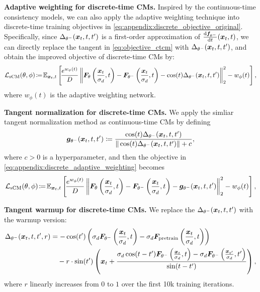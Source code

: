 \textbf{Adaptive weighting for discrete-time CMs. }
Inspired by the continuous-time consistency models, we can also apply the adaptive weighting technique into discrete-time training objectives in \eqref{eq:appendix:discrete_objective_original}. Specifically, since $\Delta_{\theta^-}({\bm{x}}_t,t,t')$ is a first-order approximation of $\frac{\mathrm{d}{\bm{f}}_{\theta^-}}{\mathrm{d} t}({\bm{x}}_t,t)$, we can directly replace the tangent in \eqref{eq:objective_ctcm} with $\Delta_{\theta^-}({\bm{x}}_t,t,t')$, and obtain the improved objective of discrete-time CMs by:
\begin{equation}
\label{eq:appendix:discrete_adaptive_weighting}
    \mathcal{L}_{\text{sCM}}(\theta,\phi) \!\coloneqq\! \mathbb{E}_{{\bm{x}}_t,t}\left[\!
    \frac{e^{w_\phi(t)}}{D}\left\|
        {\bm{F}}_\theta\left(\frac{{\bm{x}}_t}{\sigma_d},t\right) - {\bm{F}}_{\theta^-}\left(\frac{{\bm{x}}_t}{\sigma_d},t\right)
        - \cos(t)\Delta_{\theta^-}({\bm{x}}_t,t,t')
    \right\|_2^2 - w_\phi(t)
    \right],
\end{equation}
where $w_\phi(t)$ is the adaptive weighting network.

\textbf{Tangent normalization for discrete-time CMs. }
We apply the simliar tangent normalization method as continuous-time CMs by defining
\[
{\bm{g}}_{\theta^-}({\bm{x}}_t,t,t') \coloneqq \frac{\cos(t)\Delta_{\theta^-}({\bm{x}}_t,t,t')}{\|\cos(t)\Delta_{\theta^-}({\bm{x}}_t,t,t')\| + c},
\]
where $c>0$ is a hyperparameter, and then the objective in \eqref{eq:appendix:discrete_adaptive_weighting} becomes
\[
    \mathcal{L}_{\text{sCM}}(\theta,\phi) \!\coloneqq\! \mathbb{E}_{{\bm{x}}_t,t}\left[\!
    \frac{e^{w_\phi(t)}}{D}\left\|
        {\bm{F}}_\theta\left(\frac{{\bm{x}}_t}{\sigma_d},t\right) - {\bm{F}}_{\theta^-}\left(\frac{{\bm{x}}_t}{\sigma_d},t\right)
        - {\bm{g}}_{\theta^-}({\bm{x}}_t,t,t')
    \right\|_2^2 - w_\phi(t)
    \right],
\]

\textbf{Tangent warmup for discrete-time CMs. }
We replace the $\Delta_{\theta^-}({\bm{x}}_t,t,t')$ with the warmup version:
\begin{equation*}
\begin{split}
    \Delta_{\theta^-}({\bm{x}}_t,t,t',r) &= -\cos(t')\left(\sigma_d {\bm{F}}_{\theta^-}\left(\frac{{\bm{x}}_t}{\sigma_d},t\right)-\sigma_d {\bm{F}}_{\text{pretrain}}\left(\frac{{\bm{x}}_t}{\sigma_d},t\right)\right)\\
&\quad -r\cdot \sin(t')\left({\bm{x}}_t+\frac{\sigma_d\cos(t-t'){\bm{F}}_{\theta^-}\left(\frac{{\bm{x}}_t}{\sigma_d},t\right)-\sigma_d {\bm{F}}_{\theta^-}\left(\frac{{\bm{x}}_{t'}}{\sigma_d},t'\right)}{\sin(t-t')}\right),
\end{split}
\end{equation*}
where $r$ linearly increases from $0$ to $1$ over the first 10k training iterations.

